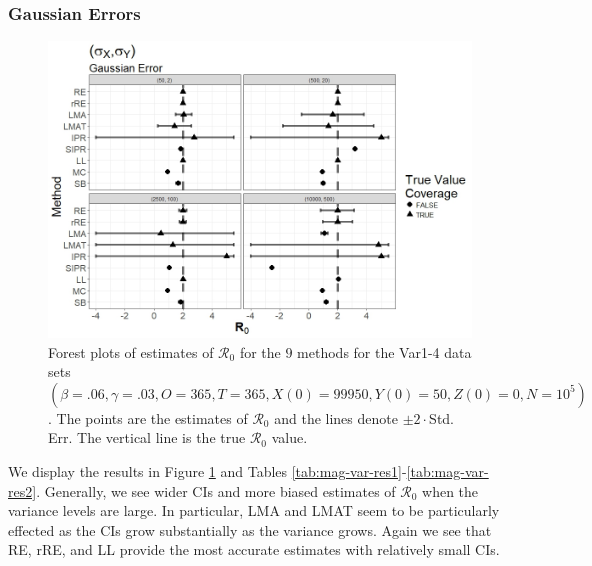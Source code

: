 \documentclass[12pt]{article}
\newcommand{\xxsir}{\ensuremath{9} } %
\newcommand{\rr}{\ensuremath{\mathcal{R}_0}}
\begin{document}
\subsubsection{Gaussian Errors}

\begin{figure}[H]
\begin{center}
  \includegraphics[scale=0.5]{images/var_n.jpeg}
  \caption{Forest plots of estimates of $\rr$ for the \xxsir methods for the Var1-4 data sets $(\beta=.06, \gamma=.03, O=365, T=365, X(0)=99950, Y(0)=50, Z(0)=0, N=10^5)$.  The points are the estimates of $\rr$ and the lines denote $\pm 2\cdot $Std. Err.  The vertical line is the true $\rr$ value.}
  \label{fig:mag-var-res}
\end{center}
\end{figure}

We display the results in Figure \ref{fig:mag-var-res} and Tables \ref{tab:mag-var-res1}-\ref{tab:mag-var-res2}.  Generally, we see wider CIs and more biased estimates of $\rr$ when the variance levels are large.  In particular, LMA and LMAT seem to be particularly effected as the CIs grow substantially as the variance grows.  Again we see that RE, rRE, and LL provide the most accurate estimates with relatively small CIs.
\end{document}
